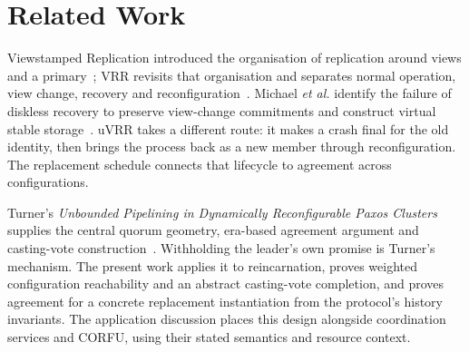 \documentclass[10pt,journal,letterpaper]{IEEEtran}
\begin{document}
\section{Related Work}\label{sec:related}
Viewstamped Replication introduced the organisation of replication around views and a primary~\cite{vr}; VRR revisits that organisation and separates normal operation, view change, recovery and reconfiguration~\cite{vrr}. Michael \emph{et al.} identify the failure of diskless recovery to preserve view-change commitments and construct virtual stable storage~\cite{diskless}. uVRR takes a different route: it makes a crash final for the old identity, then brings the process back as a new member through reconfiguration. The replacement schedule connects that lifecycle to agreement across configurations.

Turner's \emph{Unbounded Pipelining in Dynamically Reconfigurable Paxos Clusters} supplies the central quorum geometry, era-based agreement argument and casting-vote construction~\cite{turner}. Withholding the leader's own promise is Turner's mechanism. The present work applies it to reincarnation, proves weighted configuration reachability and an abstract casting-vote completion, and proves agreement for a concrete replacement instantiation from the protocol's history invariants. The application discussion places this design alongside coordination services and CORFU, using their stated semantics and resource context.
\end{document}
